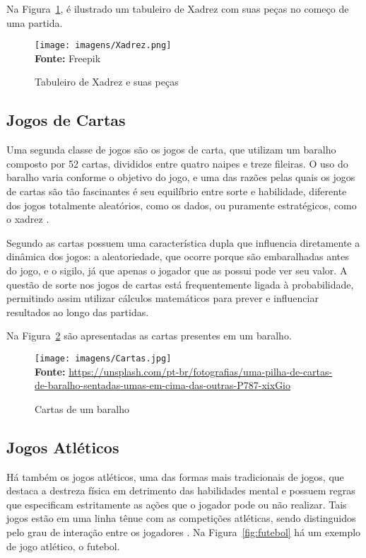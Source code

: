 Na Figura~\ref{fig:xadrez}, é ilustrado um tabuleiro de Xadrez com suas peças no começo de uma partida.


\FloatBarrier
\begin{figure}[!htbp]
	\centering
	\caption{Tabuleiro de Xadrez e suas peças}
	\texttt{[image: imagens/Xadrez.png]}
	\\\textbf{Fonte:} Freepik
	\label{fig:xadrez}
\end{figure}
\FloatBarrier

\subsection{Jogos de Cartas}

Uma segunda classe de jogos são os jogos de carta, que utilizam um baralho composto por 52 cartas, divididos entre quatro naipes e treze fileiras. O uso do baralho varia conforme o objetivo do jogo, e uma das razões pelas quais os jogos de cartas são tão fascinantes é seu equilíbrio entre sorte e habilidade, diferente dos jogos totalmente aleatórios, como os dados, ou puramente estratégicos, como o xadrez \cite{Parlett1990}.


Segundo  as cartas possuem uma característica dupla que influencia diretamente a dinâmica dos jogos: a aleatoriedade, que ocorre porque são embaralhadas antes do jogo, e o sigilo, já que apenas o jogador que as possui pode ver seu valor. A questão de sorte nos jogos de cartas está frequentemente ligada à probabilidade, permitindo assim utilizar cálculos matemáticos para prever e influenciar resultados ao longo das partidas. 

Na Figura~\ref{fig:cartas} são apresentadas as cartas presentes em um baralho.


\FloatBarrier 
\begin{figure}[!htbp]
	\centering
	\caption{Cartas de um baralho}
	\texttt{[image: imagens/Cartas.jpg]}
	\\\textbf{Fonte:} \url{https://unsplash.com/pt-br/fotografias/uma-pilha-de-cartas-de-baralho-sentadas-umas-em-cima-das-outras-P787-xixGio}
	\label{fig:cartas}
\end{figure}
\FloatBarrier


\subsection{Jogos Atléticos}


Há também os jogos atléticos, uma das formas mais tradicionais de jogos, que destaca a destreza física em detrimento das habilidades mental e possuem regras que especificam estritamente as ações que o jogador pode ou não realizar. Tais jogos estão em uma linha tênue com as competições atléticas, sendo distinguidos pelo grau de interação entre os jogadores \cite{Crawford1997}. Na Figura~\ref{fig:futebol} há um exemplo de jogo atlético, o futebol.


